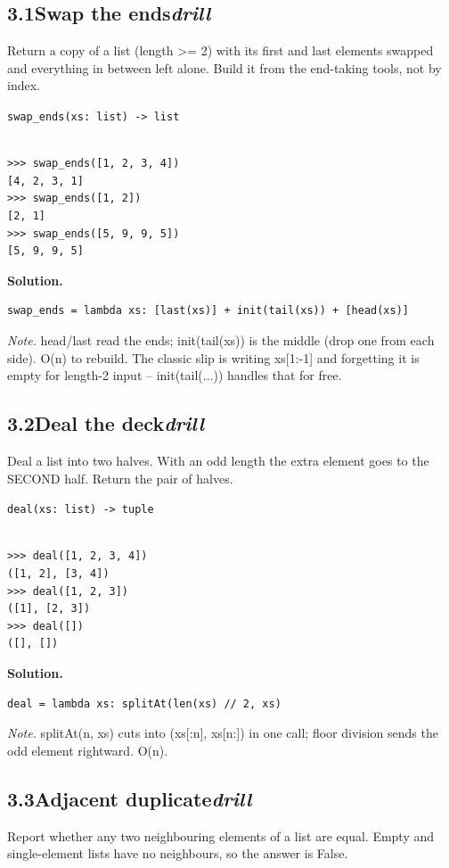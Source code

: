 \documentclass[10pt,letterpaper]{book}
\begin{document}
\subsection*{3.1\quad Swap the ends\hfill\textnormal{\textit{drill}}}
Return a copy of a list (length >= 2) with its first and last elements swapped and everything in between left alone. Build it from the end-taking tools, not by index.

\noindent\texttt{swap\_ends(xs: list) -> list}
\begin{lstlisting}[style=ex]

>>> swap_ends([1, 2, 3, 4])
[4, 2, 3, 1]
>>> swap_ends([1, 2])
[2, 1]
>>> swap_ends([5, 9, 9, 5])
[5, 9, 9, 5]

\end{lstlisting}
\noindent\textbf{Solution.}
\begin{lstlisting}[style=code]
swap_ends = lambda xs: [last(xs)] + init(tail(xs)) + [head(xs)]
\end{lstlisting}
\noindent\textit{Note.} head/last read the ends; init(tail(xs)) is the middle (drop one from each side). O(n) to rebuild. The classic slip is writing xs[1:-1] and forgetting it is empty for length-2 input -- init(tail(...)) handles that for free.

\subsection*{3.2\quad Deal the deck\hfill\textnormal{\textit{drill}}}
Deal a list into two halves. With an odd length the extra element goes to the SECOND half. Return the pair of halves.

\noindent\texttt{deal(xs: list) -> tuple}
\begin{lstlisting}[style=ex]

>>> deal([1, 2, 3, 4])
([1, 2], [3, 4])
>>> deal([1, 2, 3])
([1], [2, 3])
>>> deal([])
([], [])

\end{lstlisting}
\noindent\textbf{Solution.}
\begin{lstlisting}[style=code]
deal = lambda xs: splitAt(len(xs) // 2, xs)
\end{lstlisting}
\noindent\textit{Note.} splitAt(n, xs) cuts into (xs[:n], xs[n:]) in one call; floor division sends the odd element rightward. O(n).

\subsection*{3.3\quad Adjacent duplicate\hfill\textnormal{\textit{drill}}}
Report whether any two neighbouring elements of a list are equal. Empty and single-element lists have no neighbours, so the answer is False.
\end{document}
